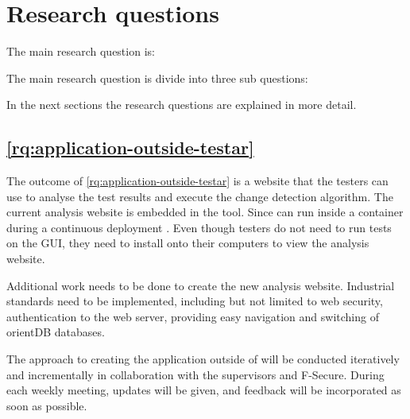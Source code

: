 \section{Research questions} \label{research-questions}

The main research question is:

\textbf{\rqMainQuestion}

The main research question is divide into three sub questions:

\begin{questions}
    \item \rqApplicationOutsideTestar \label{rq:application-outside-testar}
    \item \rqHowMakingChangeDetectionAlgorithm \label{rq:how-making-change-detection-algorithm}
    \item \rqHowToVisualiseResult \label{rq:how-to-visualise-result}
\end{questions}

In the next sections the research questions are explained in more detail.

\subsection{\ref{rq:application-outside-testar} \rqApplicationOutsideTestar}

The outcome of \ref{rq:application-outside-testar} is a website that the testers can use to analyse the test results and execute the change detection algorithm. The current analysis website is embedded in the \testar tool. Since \testar can run inside a container during a continuous deployment \cite{thesisSlomp}. Even though testers do not need \testar to run tests on the GUI, they need to install \testar onto their computers to view the analysis website. 

Additional work needs to be done to create the new analysis website. Industrial standards need to be implemented, including but not limited to web security, authentication to the web server, providing easy navigation and switching of orientDB databases. 

The approach to creating the application outside of \testar will be conducted iteratively and incrementally in collaboration with the supervisors and F-Secure. During each weekly meeting, updates will be given, and feedback will be incorporated as soon as possible. 

